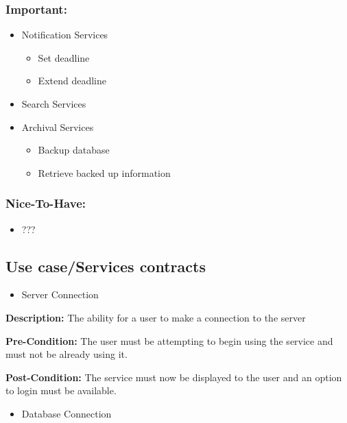 \documentclass[11pt]{article}
\begin{document}
\begin{itemize}
\begin{itemize}
		\end{itemize}
	\end{itemize}
	
\subsubsection{Important:}	
	\begin{itemize}
		\item Notification Services
		\begin{itemize}
			\item Set deadline
			\item Extend deadline
		\end{itemize}
		\item Search Services
		\item Archival Services
		\begin{itemize}
			\item Backup  database
			\item Retrieve backed up information
		\end{itemize}
	\end{itemize} 
	
\subsubsection{Nice-To-Have:}
	\begin{itemize}
		\item ???
	\end{itemize}

\subsection{Use case/Services contracts}
\begin{itemize}
	\item Server Connection
\end{itemize}

{\raggedright
	\textbf{Description: }The ability for a user to make a connection to the server
}

{\raggedright
	\textbf{Pre-Condition: }The user must be attempting to begin using the service
	and must not be already using it.
}

{\raggedright
	\textbf{Post-Condition:} The service must now be displayed to the user and an
	option to login must be available.
}

\begin{itemize}
	\item Database Connection
\end{itemize}
\end{document}
